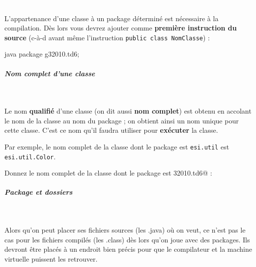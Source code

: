 \documentclass[a4paper,11pt]{article}
\begin{document}
					\textcolor{white}{.} 
				
           			L'appartenance d'une classe \`a un package d\'etermin\'e est n\'ecessaire \`a la compilation. 
				D\`es lors vous devrez ajouter comme \textbf{premi\`ere instruction du source} 
				(c-\`a-d avant m\^eme l'instruction \verb|public class NomClasse|) :
			
            \par
        				\begin{Code}{java}
					package g32010.td6;
				\end{Code}
			
		\subparagraph{Nom complet d'une classe} 
		
					\textcolor{white}{.} 
				
          			Le nom \textbf{qualifi\'e} d'une classe (on dit aussi \textbf{nom complet})
				est obtenu en accolant le nom de la classe au nom du package ; on obtient ainsi un nom unique pour cette classe.
				C'est ce nom qu'il faudra utiliser pour \textbf{ex\'ecuter} la classe.
			
            \par
        
				Par exemple, le nom complet de la classe \verb@Color@ dont le package est \verb|esi.util|
				est \verb|esi.util.Color|. 
			
            \par
        		\begin{Exercice}{}
				Donnez le nom complet de la classe \verb@SurfaceTriangle@ dont le package est 
				\verb@g32010.td6@ : 
				\par
		\end{Exercice}	
		
		\subparagraph{Package et dossiers} 
		
				\textcolor{white}{.} 
									
				Alors qu'on peut placer ses fichiers sources (les .java) o\`u on veut, ce n'est pas le cas pour les fichiers
				compil\'es (les .class) d\`es lors qu'on joue avec des packages. Ils devront \^etre plac\'es \`a un endroit bien pr\'ecis
				pour que le compilateur et la machine virtuelle puissent les retrouver.
			
            \par
        			
\end{document}
